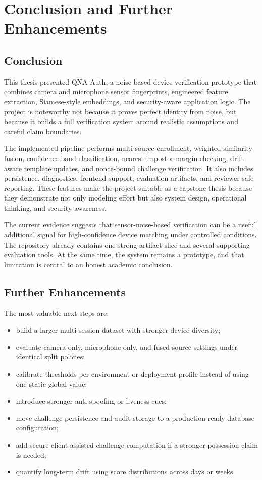 \documentclass[12pt]{report}
\begin{document}
\chapter{Conclusion and Further Enhancements}
\section{Conclusion}
This thesis presented QNA-Auth, a noise-based device verification prototype that combines camera and microphone sensor fingerprints, engineered feature extraction, Siamese-style embeddings, and security-aware application logic. The project is noteworthy not because it proves perfect identity from noise, but because it builds a full verification system around realistic assumptions and careful claim boundaries.

The implemented pipeline performs multi-source enrollment, weighted similarity fusion, confidence-band classification, nearest-impostor margin checking, drift-aware template updates, and nonce-bound challenge verification. It also includes persistence, diagnostics, frontend support, evaluation artifacts, and reviewer-safe reporting. These features make the project suitable as a capstone thesis because they demonstrate not only modeling effort but also system design, operational thinking, and security awareness.

The current evidence suggests that sensor-noise-based verification can be a useful additional signal for high-confidence device matching under controlled conditions. The repository already contains one strong artifact slice and several supporting evaluation tools. At the same time, the system remains a prototype, and that limitation is central to an honest academic conclusion.

\section{Further Enhancements}
The most valuable next steps are:
\begin{itemize}[leftmargin=1.2cm]
\item build a larger multi-session dataset with stronger device diversity;
\item evaluate camera-only, microphone-only, and fused-source settings under identical split policies;
\item calibrate thresholds per environment or deployment profile instead of using one static global value;
\item introduce stronger anti-spoofing or liveness cues;
\item move challenge persistence and audit storage to a production-ready database configuration;
\item add secure client-assisted challenge computation if a stronger possession claim is needed;
\item quantify long-term drift using score distributions across days or weeks.
\end{itemize}
\end{document}
